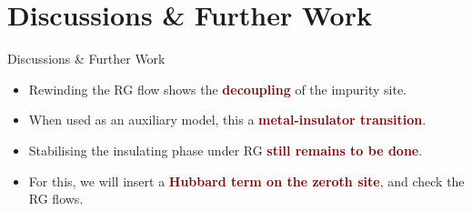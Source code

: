 \documentclass[aspectratio=169]{beamer}
\newcommand{\focus}[1]{\textcolor{maroon}{\textbf{#1}}}
\begin{document}
\section{Discussions \& Further Work}
\begin{frame}[noframenumbering]{Discussions \& Further Work}
	\begin{itemize}[<+-|alert@+>]
		\item Rewinding the RG flow shows the \focus{decoupling} of the impurity site.
 		\item When used as an auxiliary model, this a \focus{metal-insulator transition}.
 		\item Stabilising the insulating phase under RG \focus{still remains to be done}.
 		\item For this, we will insert a \focus{Hubbard term on the zeroth site}, and check the RG flows.
	\end{itemize}
\end{frame}






\end{document}
